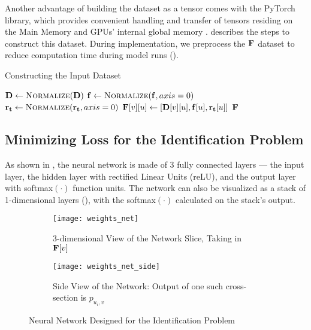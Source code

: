 Another advantage of building the dataset as a tensor comes with the PyTorch library, which provides convenient handling and transfer of tensors residing on the Main Memory and GPUs' internal global memory \cite{PTDocs}.  describes the steps to construct this dataset. During implementation, we preprocess the $\mathbf{F}$ dataset to reduce computation time during model runs ().
\begin{algorithm}[!htbp]
    \caption{Constructing the Input Dataset} \label{alg:Constructing the Input Dataset}
    \begin{algorithmic}[1]
        \State $\matr{D} \gets \Call{Normalize}{\matr{D}}$
        \State $\vect{f} \gets \Call{Normalize}{\mathbf{f}, axis = 0}$
        \State $\vect{r_t} \gets \Call{Normalize}{\vect{r_t}, axis = 0}$
                \State $\mathbf{F}[v][u] \gets [\mathbf{D}[v][u], \mathbf{f}[u], \mathbf{r_t}[u]]$ 
             \EndFor
        \EndFor
        \State \Return $\mathbf{F}$
        \EndFunction
    \end{algorithmic}
\end{algorithm}

\subsection{Minimizing Loss for the Identification Problem} \label{sec:Minimizing Loss for the Identification Problem}
As shown in , the neural network is made of 3 fully connected layers --- the input layer, the hidden layer with rectified Linear Units (reLU), and the output layer with softmax$(\cdot)$ function units. The network can also be visualized as a stack of 1-dimensional layers (), with the softmax$(\cdot)$ calculated on the stack's output.
\begin{figure}[!htbp]
    \centering
    \begin{subfigure}{\textwidth}
        \centering
        \texttt{[image: weights\_net]}
        \caption{3-dimensional View of the Network Slice, Taking in $\mathbf{F}[v]$}
        \label{fig:3-dimensional view of the network slice taking in Fv}
    \end{subfigure}
    \begin{subfigure}{.75\textwidth}
        \centering
        \texttt{[image: weights\_net\_side]}
        \caption{Side View of the Network: Output of one such cross-section is $p_{u_i, v}$}
        \label{fig:Side view of the network}
    \end{subfigure}
    \caption{Neural Network Designed for the Identification Problem}
    \label{fig:Neural network designed for the Identification Problem}
\end{figure}


